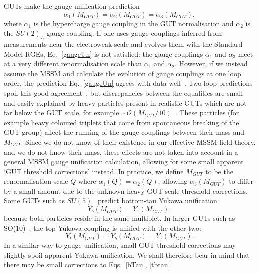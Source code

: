 \documentclass[final,3p,times,pdflatex]{elsarticle}
\begin{document}
GUTs make the gauge unification prediction 
\begin{equation}
\alpha_1(M_{GUT})=\alpha_2(M_{GUT})=\alpha_3(M_{GUT}),  \label{gaugeUn}
\end{equation}
where $\alpha_1$ is the hypercharge gauge coupling in the GUT normalisation
and
$\alpha_2$ is the $SU(2)_L$ gauge coupling. 
If one uses gauge couplings inferred from measurements near the electroweak
scale 
and 
evolves them with the Standard Model RGEs, Eq.~\ref{gaugeUn} is not satisfied:
the gauge couplings $\alpha_1$ and $\alpha_3$ meet at a very different
renormalisation scale than $\alpha_1$ and $\alpha_2$. However, if we instead
assume the MSSM and calculate the evolution of gauge couplings at one loop
order, the prediction Eq.~\ref{gaugeUn} agrees with data
well~\cite{Amaldi:1987fu}. Two-loop 
predictions spoil this good agreement~\cite{Shifman:1994py}, but discrepancies
between the 
equalities are small and easily explained by heavy particles present in
realistic GUTs which
are not far below the GUT scale, for example $\sim \mathcal
O(M_{GUT}/10)$~\cite{Hall:1995eq}.  
These particles (for example heavy coloured triplets that come from
spontaneous breaking of the GUT group) affect the running of the gauge
couplings between their mass and $M_{GUT}$. Since we do not know of their
existence in our effective MSSM field theory, and we do not know their mass,
these effects are not taken into account in a general MSSM gauge unification
calculation, allowing for some small apparent `GUT threshold corrections' 
instead.
In practice, we define $M_{GUT}$
to be the renormalisation scale $Q$ where $\alpha_1(Q)=\alpha_2(Q)$, allowing
$\alpha_3(M_{GUT})$ to 
differ by a small amount due to the unknown heavy GUT-scale threshold
corrections.  
Some GUTs such as $SU(5)$~\cite{su5,su5b} predict bottom-tau
Yukawa unification 
\begin{equation}
Y_b(M_{GUT})=Y_\tau(M_{GUT}), \label{bTau}
\end{equation}
because both
particles reside in the same multiplet. In larger GUTs such as
SO(10)~\cite{Carena:1994bv}, the top  
Yukawa coupling is unified with the other two:
\begin{equation}
Y_t(M_{GUT})=Y_b(M_{GUT})=Y_\tau(M_{GUT}). \label{tbtau}
\end{equation}
In a similar way to gauge unification, small GUT threshold corrections may
slightly spoil apparent Yukawa unification. We shall therefore bear in mind
that there 
may be small corrections to Eqs.~\ref{bTau}, \ref{tbtau}.
\end{document}
